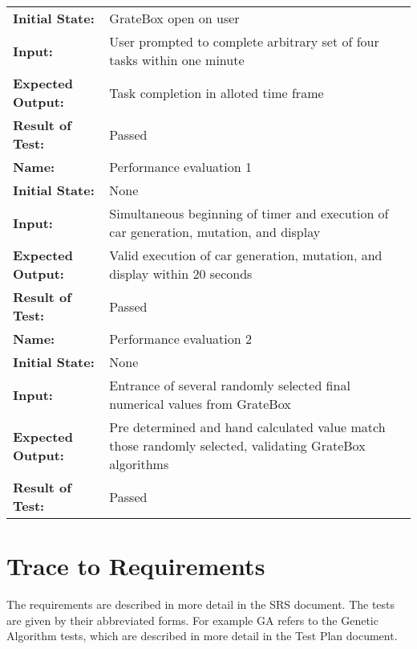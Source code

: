 \documentclass[12pt, titlepage]{article}
\begin{document}
\begin{center}
\begin{longtable}{ l | p{10cm} }
\textbf{Initial State:} & GrateBox open on user\\
\textbf{Input:} & User prompted to complete arbitrary set of four tasks within 
one minute\\
\textbf{Expected Output:} & Task completion in alloted time frame\\[0.6em]
\textbf{Result of Test:} & Passed\\
\hline
\rule{0pt}{1.5em}\textbf{Name:} & Performance evaluation 1\\
\textbf{Initial State:} & None\\
\textbf{Input:} & Simultaneous beginning of timer and execution of car 
generation, mutation, and display\\
\textbf{Expected Output:} & Valid execution of car generation, mutation, and 
display within 20 seconds\\[0.6em]
\textbf{Result of Test:} & Passed\\
\hline
\rule{0pt}{1.5em}\textbf{Name:} & Performance evaluation 2\\
\textbf{Initial State:} & None\\
\textbf{Input:} & Entrance of several randomly selected final numerical values 
from GrateBox\\
\textbf{Expected Output:} & Pre determined and hand calculated value match those 
randomly selected, validating GrateBox algorithms\\[0.6em]
\textbf{Result of Test:} & Passed\\
\end{longtable}
\end{center}

\section{Trace to Requirements}

The requirements are described in more detail in the SRS document. The tests are 
given by their abbreviated forms. For example GA refers to the Genetic Algorithm 
tests, which are described in more detail in the Test Plan document.
		
\end{document}
